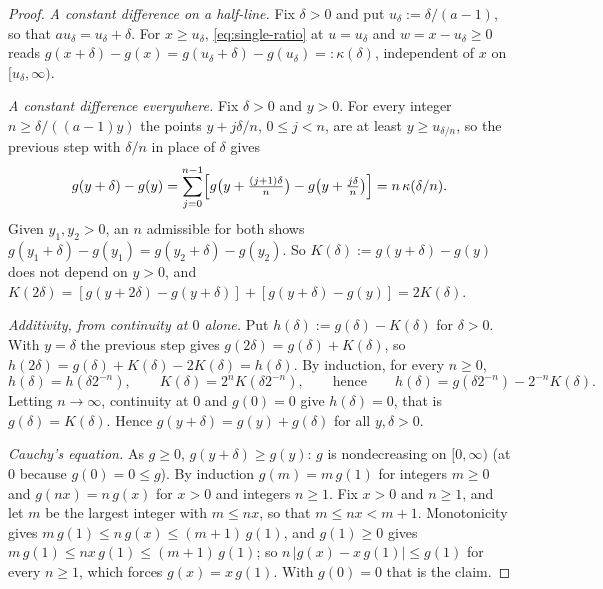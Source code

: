 \begin{proof}
\leanok
\emph{A constant difference on a half-line.} Fix $\delta > 0$ and put $u_\delta := \delta/(a-1)$,
so that $a u_\delta = u_\delta + \delta$. For $x \ge u_\delta$, \ref{eq:single-ratio} at
$u = u_\delta$ and $w = x - u_\delta \ge 0$ reads
$g(x+\delta) - g(x) = g(u_\delta + \delta) - g(u_\delta) =: \kappa(\delta)$, independent of $x$ on
$[u_\delta,\infty)$.

\emph{A constant difference everywhere.} Fix $\delta > 0$ and $y > 0$. For every integer
$n \ge \delta/((a-1)y)$ the points $y + j\delta/n$, $0 \le j < n$, are at least
$y \ge u_{\delta/n}$, so the previous step with $\delta/n$ in place of $\delta$ gives
\[
  g(y+\delta) - g(y) = \sum_{j=0}^{n-1}\Bigl[g\bigl(y + \tfrac{(j+1)\delta}{n}\bigr)
     - g\bigl(y + \tfrac{j\delta}{n}\bigr)\Bigr] = n\,\kappa(\delta/n) .
\]
Given $y_1, y_2 > 0$, an $n$ admissible for both shows
$g(y_1+\delta) - g(y_1) = g(y_2+\delta) - g(y_2)$. So $K(\delta) := g(y+\delta) - g(y)$ does not
depend on $y > 0$, and $K(2\delta) = [g(y+2\delta) - g(y+\delta)] + [g(y+\delta) - g(y)]
= 2K(\delta)$.

\emph{Additivity, from continuity at $0$ alone.} Put $h(\delta) := g(\delta) - K(\delta)$ for
$\delta > 0$. With $y = \delta$ the previous step gives $g(2\delta) = g(\delta) + K(\delta)$, so
$h(2\delta) = g(\delta) + K(\delta) - 2K(\delta) = h(\delta)$. By induction, for every $n \ge 0$,
\[
  h(\delta) = h(\delta 2^{-n}) , \qquad K(\delta) = 2^nK(\delta 2^{-n}) , \qquad\text{hence}\qquad
  h(\delta) = g(\delta 2^{-n}) - 2^{-n}K(\delta) .
\] Letting $n \to \infty$, continuity at $0$ and
$g(0) = 0$ give $h(\delta) = 0$, that is $g(\delta) = K(\delta)$. Hence
$g(y + \delta) = g(y) + g(\delta)$ for all $y, \delta > 0$.

\emph{Cauchy's equation.} As $g \ge 0$, $g(y+\delta) \ge g(y)$: $g$ is nondecreasing on
$[0,\infty)$ (at $0$ because $g(0) = 0 \le g$). By induction $g(m) = m\,g(1)$ for integers
$m \ge 0$ and $g(nx) = n\,g(x)$ for $x > 0$ and integers $n \ge 1$. Fix $x > 0$ and $n \ge 1$, and
let $m$ be the largest integer with $m \le nx$, so that $m \le nx < m + 1$. Monotonicity gives
$m\,g(1) \le n\,g(x) \le (m+1)\,g(1)$, and $g(1) \ge 0$ gives
$m\,g(1) \le nx\,g(1) \le (m+1)\,g(1)$; so $n\,|g(x) - x\,g(1)| \le g(1)$ for every $n \ge 1$, which
forces $g(x) = x\,g(1)$. With $g(0) = 0$ that is the claim.
\end{proof}

